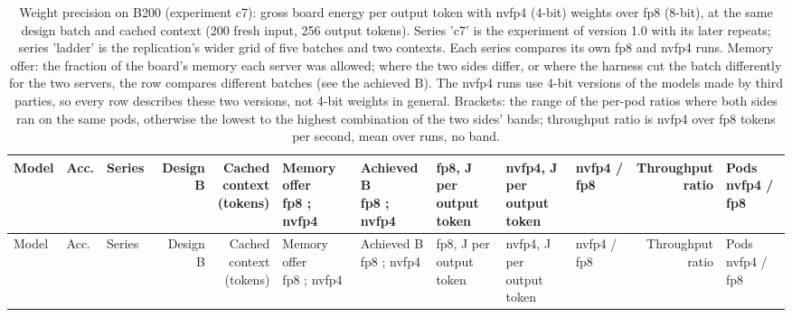 \begin{landscape}
\begingroup
\scriptsize
\setlength{\tabcolsep}{3pt}
\begin{longtable}{lllrrlllllrl}
\caption{Weight precision on B200 (experiment c7): gross board energy per output token with nvfp4 (4-bit) weights over fp8 (8-bit), at the same design batch and cached context (200 fresh input, 256 output tokens). Series 'c7' is the experiment of version 1.0 with its later repeats; series 'ladder' is the replication's wider grid of five batches and two contexts. Each series compares its own fp8 and nvfp4 runs. Memory offer: the fraction of the board's memory each server was allowed; where the two sides differ, or where the harness cut the batch differently for the two servers, the row compares different batches (see the achieved B). The nvfp4 runs use 4-bit versions of the models made by third parties, so every row describes these two versions, not 4-bit weights in general. Brackets: the range of the per-pod ratios where both sides ran on the same pods, otherwise the lowest to the highest combination of the two sides' bands; throughput ratio is nvfp4 over fp8 tokens per second, mean over runs, no band.}\label{tab:precision}\\
\toprule
Model & Acc. & Series & Design B & \makecell[r]{Cached\\context\\(tokens)} & \makecell[l]{Memory offer\\fp8 ; nvfp4} & \makecell[l]{Achieved B\\fp8 ; nvfp4} & \makecell[l]{fp8, J per\\output token} & \makecell[l]{nvfp4, J per\\output token} & nvfp4 / fp8 & \makecell[r]{Throughput\\ratio} & \makecell[l]{Pods nvfp4 /\\fp8} \\
\midrule
\endfirsthead
\toprule
Model & Acc. & Series & Design B & \makecell[r]{Cached\\context\\(tokens)} & \makecell[l]{Memory offer\\fp8 ; nvfp4} & \makecell[l]{Achieved B\\fp8 ; nvfp4} & \makecell[l]{fp8, J per\\output token} & \makecell[l]{nvfp4, J per\\output token} & nvfp4 / fp8 & \makecell[r]{Throughput\\ratio} & \makecell[l]{Pods nvfp4 /\\fp8} \\

\end{longtable}
\end{landscape}
